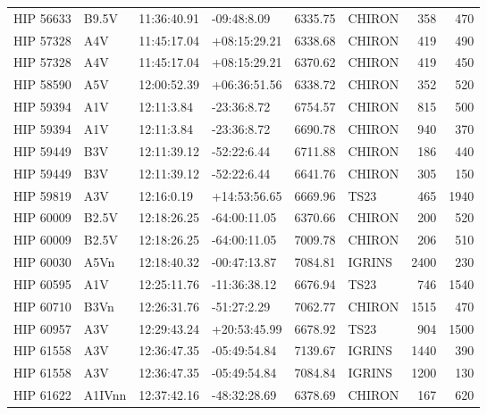 \documentclass{emulateapj}
\begin{document}
\begin{longtable*}{|l|lllrlrr|}
   HIP 56633 &          B9.5V &    11:36:40.91 &    -09:48:8.09 &  6335.75 &     CHIRON &      358 &     470 \\
   HIP 57328 &            A4V &    11:45:17.04 &   +08:15:29.21 &  6338.68 &     CHIRON &      419 &     490 \\
   HIP 57328 &            A4V &    11:45:17.04 &   +08:15:29.21 &  6370.62 &     CHIRON &      419 &     450 \\
   HIP 58590 &            A5V &    12:00:52.39 &   +06:36:51.56 &  6338.72 &     CHIRON &      352 &     520 \\
   HIP 59394 &            A1V &     12:11:3.84 &    -23:36:8.72 &  6754.57 &     CHIRON &      815 &     500 \\
   HIP 59394 &            A1V &     12:11:3.84 &    -23:36:8.72 &  6690.78 &     CHIRON &      940 &     370 \\
   HIP 59449 &            B3V &    12:11:39.12 &    -52:22:6.44 &  6711.88 &     CHIRON &      186 &     440 \\
   HIP 59449 &            B3V &    12:11:39.12 &    -52:22:6.44 &  6641.76 &     CHIRON &      305 &     150 \\
   HIP 59819 &            A3V &     12:16:0.19 &   +14:53:56.65 &  6669.96 &       TS23 &      465 &    1940 \\
   HIP 60009 &          B2.5V &    12:18:26.25 &   -64:00:11.05 &  6370.66 &     CHIRON &      200 &     520 \\
   HIP 60009 &          B2.5V &    12:18:26.25 &   -64:00:11.05 &  7009.78 &     CHIRON &      206 &     510 \\
   HIP 60030 &           A5Vn &    12:18:40.32 &   -00:47:13.87 &  7084.81 &     IGRINS &     2400 &     230 \\
   HIP 60595 &            A1V &    12:25:11.76 &   -11:36:38.12 &  6676.94 &       TS23 &      746 &    1540 \\
   HIP 60710 &           B3Vn &    12:26:31.76 &    -51:27:2.29 &  7062.77 &     CHIRON &     1515 &     470 \\
   HIP 60957 &            A3V &    12:29:43.24 &   +20:53:45.99 &  6678.92 &       TS23 &      904 &    1500 \\
   HIP 61558 &            A3V &    12:36:47.35 &   -05:49:54.84 &  7139.67 &     IGRINS &     1440 &     390 \\
   HIP 61558 &            A3V &    12:36:47.35 &   -05:49:54.84 &  7084.84 &     IGRINS &     1200 &     130 \\
   HIP 61622 &         A1IVnn &    12:37:42.16 &   -48:32:28.69 &  6378.69 &     CHIRON &      167 &     620 \\

\end{longtable*}
\end{document}
